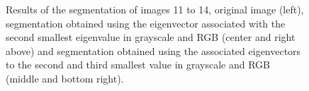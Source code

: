 \documentclass[conference]{IEEEtran}
\begin{document}
\begin{figure}[htbp]
\caption{Results of the segmentation of images 11 to 14, original image (left), segmentation obtained using the eigenvector associated with the second smallest eigenvalue in grayscale and RGB (center and right above) and segmentation obtained using the associated eigenvectors to the second and third smallest value in grayscale and RGB (middle and bottom right).}
\label{res2}
\end{figure}
\FloatBarrier
\end{document}
